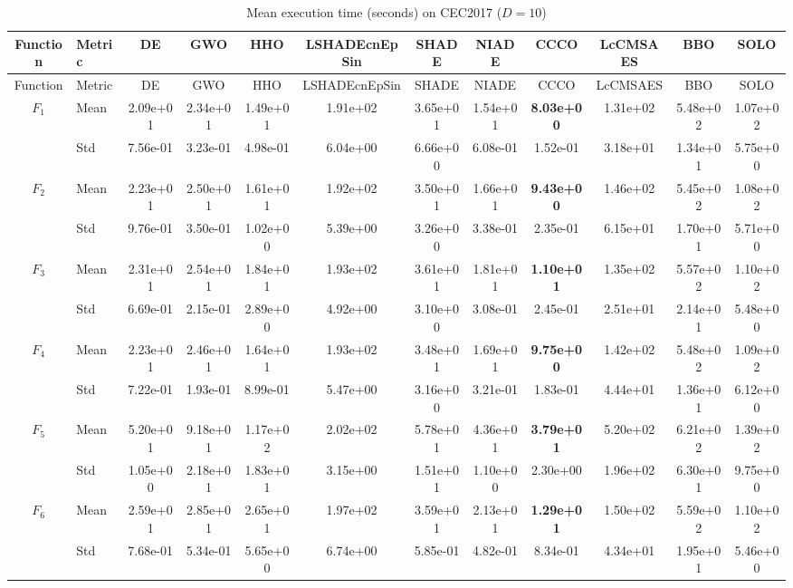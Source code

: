 \begin{center}
\small
\renewcommand{\arraystretch}{1.25}
\begin{longtable}{clcccccccccc}
\caption{Mean execution time (seconds) on CEC2017 ($D=10$) }
\label{tab:time_CEC2017_10} \\
\toprule
Function & Metric & DE & GWO & HHO & LSHADEcnEpSin & SHADE & NIADE & CCCO & LcCMSAES & BBO & SOLO \\
\midrule
\endfirsthead
\toprule
Function & Metric & DE & GWO & HHO & LSHADEcnEpSin & SHADE & NIADE & CCCO & LcCMSAES & BBO & SOLO \\
\midrule
\endhead
$F_{1}$ & Mean & 2.09e+01 & 2.34e+01 & 1.49e+01 & 1.91e+02 & 3.65e+01 & 1.54e+01 & \textbf{8.03e+00} & 1.31e+02 & 5.48e+02 & 1.07e+02 \\
 & Std & 7.56e-01 & 3.23e-01 & 4.98e-01 & 6.04e+00 & 6.66e+00 & 6.08e-01 & 1.52e-01 & 3.18e+01 & 1.34e+01 & 5.75e+00 \\
\midrule
$F_{2}$ & Mean & 2.23e+01 & 2.50e+01 & 1.61e+01 & 1.92e+02 & 3.50e+01 & 1.66e+01 & \textbf{9.43e+00} & 1.46e+02 & 5.45e+02 & 1.08e+02 \\
 & Std & 9.76e-01 & 3.50e-01 & 1.02e+00 & 5.39e+00 & 3.26e+00 & 3.38e-01 & 2.35e-01 & 6.15e+01 & 1.70e+01 & 5.71e+00 \\
\midrule
$F_{3}$ & Mean & 2.31e+01 & 2.54e+01 & 1.84e+01 & 1.93e+02 & 3.61e+01 & 1.81e+01 & \textbf{1.10e+01} & 1.35e+02 & 5.57e+02 & 1.10e+02 \\
 & Std & 6.69e-01 & 2.15e-01 & 2.89e+00 & 4.92e+00 & 3.10e+00 & 3.08e-01 & 2.45e-01 & 2.51e+01 & 2.14e+01 & 5.48e+00 \\
\midrule
$F_{4}$ & Mean & 2.23e+01 & 2.46e+01 & 1.64e+01 & 1.93e+02 & 3.48e+01 & 1.69e+01 & \textbf{9.75e+00} & 1.42e+02 & 5.48e+02 & 1.09e+02 \\
 & Std & 7.22e-01 & 1.93e-01 & 8.99e-01 & 5.47e+00 & 3.16e+00 & 3.21e-01 & 1.83e-01 & 4.44e+01 & 1.36e+01 & 6.12e+00 \\
\midrule
$F_{5}$ & Mean & 5.20e+01 & 9.18e+01 & 1.17e+02 & 2.02e+02 & 5.78e+01 & 4.36e+01 & \textbf{3.79e+01} & 5.20e+02 & 6.21e+02 & 1.39e+02 \\
 & Std & 1.05e+00 & 2.18e+01 & 1.83e+01 & 3.15e+00 & 1.51e+01 & 1.10e+00 & 2.30e+00 & 1.96e+02 & 6.30e+01 & 9.75e+00 \\
\midrule
$F_{6}$ & Mean & 2.59e+01 & 2.85e+01 & 2.65e+01 & 1.97e+02 & 3.59e+01 & 2.13e+01 & \textbf{1.29e+01} & 1.50e+02 & 5.59e+02 & 1.10e+02 \\
 & Std & 7.68e-01 & 5.34e-01 & 5.65e+00 & 6.74e+00 & 5.85e-01 & 4.82e-01 & 8.34e-01 & 4.34e+01 & 1.95e+01 & 5.46e+00 \\

\end{longtable}
\end{center}
